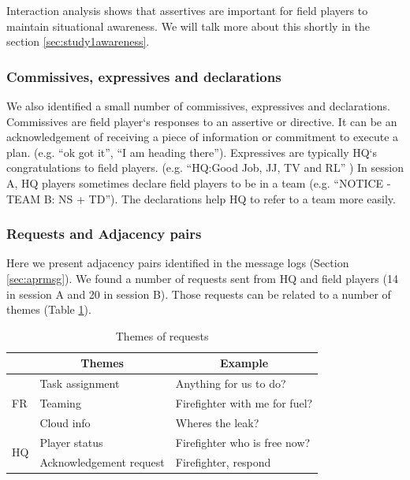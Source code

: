 Interaction analysis shows that assertives are important for field players to maintain situational awareness. We will talk more about this shortly in the section \ref{sec:study1awareness}.\\

\subsubsection{Commissives, expressives and declarations}
We also identified a small number of commissives, expressives and declarations. Commissives are field player`s responses to an assertive or directive. It can be an acknowledgement of receiving a piece of information or commitment to execute a plan. (e.g. ``ok got it'', ``I am heading there''). Expressives are typically HQ`s congratulations to field players. (e.g. ``HQ:Good Job, JJ, TV and RL'' ) In session A, HQ players sometimes declare field players to be in a team (e.g. ``NOTICE - TEAM B: NS + TD''). The declarations help HQ to refer to a team more easily.\\

\subsubsection{Requests and Adjacency pairs}\label{sec:adjpairs}
Here we present adjacency pairs identified in the message logs (Section \ref{sec:aprmsg}). We found a number of requests sent from HQ and field players (14 in session A and 20 in session B). Those requests can be related to a number of themes (Table \ref{tab:requestThemes}).\\

\begin{table}[h]
\footnotesize
\begin{tabular}{l|ll}
                    & \multicolumn{1}{c}{Themes} & \multicolumn{1}{c}{Example}   \\ \hline
\multirow{3}{*}{FR} & Task assignment            & Anything for us to do?        \\
                    & Teaming                    & Firefighter with me for fuel? \\
                    & Cloud info                 & Wheres the leak?              \\ \hline
\multirow{2}{*}{HQ} & Player status              & Firefighter who is free now?  \\
                    & Acknowledgement request    & Firefighter, respond         
\end{tabular}
\caption{Themes of requests}
\label{tab:requestThemes}
\end{table}


